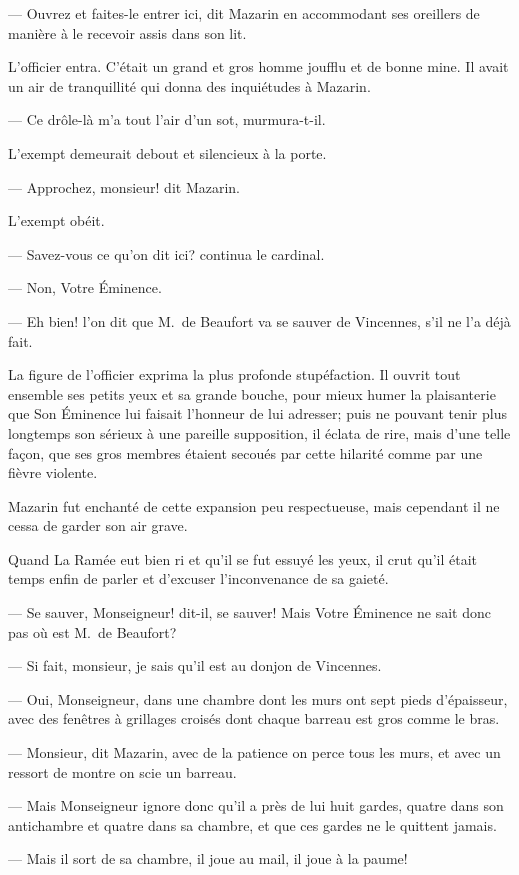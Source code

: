 — Ouvrez et faites-le entrer ici, dit Mazarin en accommodant ses oreillers de manière à le recevoir assis dans son lit.

L'officier entra. C'était un grand et gros homme joufflu et de bonne mine. Il avait un air de tranquillité qui donna des inquiétudes à Mazarin.

— Ce drôle-là m'a tout l'air d'un sot, murmura-t-il.

L'exempt demeurait debout et silencieux à la porte.

— Approchez, monsieur! dit Mazarin.

L'exempt obéit.

— Savez-vous ce qu'on dit ici? continua le cardinal.

— Non, Votre Éminence.

— Eh bien! l'on dit que M.~de Beaufort va se sauver de Vincennes, s'il ne l'a déjà fait.

La figure de l'officier exprima la plus profonde stupéfaction. Il ouvrit tout ensemble ses petits yeux et sa grande bouche, pour mieux humer la plaisanterie que Son Éminence lui faisait l'honneur de lui adresser; puis ne pouvant tenir plus longtemps son sérieux à une pareille supposition, il éclata de rire, mais d'une telle façon, que ses gros membres étaient secoués par cette hilarité comme par une fièvre violente.

Mazarin fut enchanté de cette expansion peu respectueuse, mais cependant il ne cessa de garder son air grave.

Quand La Ramée eut bien ri et qu'il se fut essuyé les yeux, il crut qu'il était temps enfin de parler et d'excuser l'inconvenance de sa gaieté.

— Se sauver, Monseigneur! dit-il, se sauver! Mais Votre Éminence ne sait donc pas où est M.~de Beaufort?

— Si fait, monsieur, je sais qu'il est au donjon de Vincennes.

— Oui, Monseigneur, dans une chambre dont les murs ont sept pieds d'épaisseur, avec des fenêtres à grillages croisés dont chaque barreau est gros comme le bras.

— Monsieur, dit Mazarin, avec de la patience on perce tous les murs, et avec un ressort de montre on scie un barreau.

— Mais Monseigneur ignore donc qu'il a près de lui huit gardes, quatre dans son antichambre et quatre dans sa chambre, et que ces gardes ne le quittent jamais.

— Mais il sort de sa chambre, il joue au mail, il joue à la paume!

